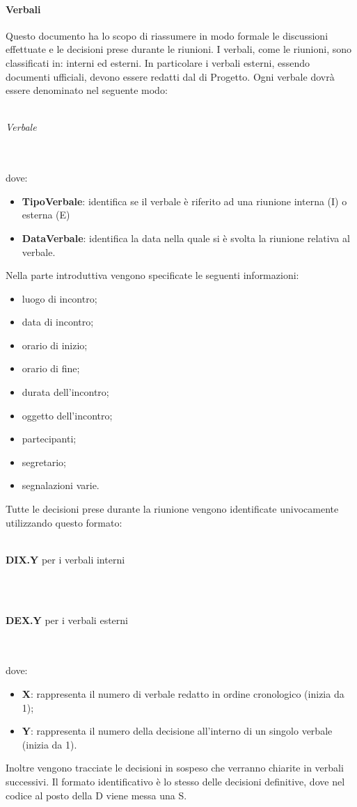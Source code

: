  \paragraph{Verbali}
Questo documento ha lo scopo di riassumere in modo formale le discussioni effettuate e le decisioni prese durante le riunioni. I verbali, come le riunioni, sono classificati in: interni ed esterni. In
particolare i verbali esterni, essendo documenti ufficiali, devono essere redatti dal \RESP{} di Progetto.
Ogni verbale dovrà essere denominato nel seguente modo:\\ \\
\centerline{\textit{Verbale}}
\\ \\
dove:
\begin{itemize}
	\item \textbf{TipoVerbale}: identifica se il verbale è riferito ad una riunione interna (I) o esterna (E)
	\item \textbf{DataVerbale}: identifica la data nella quale si è svolta la riunione relativa al verbale.
\end{itemize}
Nella parte introduttiva vengono specificate le seguenti informazioni:
\begin{itemize}
	\item luogo di incontro;
	\item data di incontro;
	\item orario di inizio;
	\item orario di fine;
	\item durata dell'incontro;
	\item oggetto dell'incontro;
	\item partecipanti;
	\item segretario;
	\item segnalazioni varie.
\end{itemize}
Tutte le decisioni prese durante la riunione vengono identificate univocamente utilizzando questo formato: \\ \\
\centerline{\textbf{DIX.Y} per i verbali interni}  \\ \\
\centerline{\textbf{DEX.Y} per i verbali esterni}  \\ \\
dove:
\begin{itemize}
	\item \textbf{X}: rappresenta il numero di verbale redatto in ordine cronologico (inizia da 1);
	\item \textbf{Y}: rappresenta il numero della decisione all'interno di un singolo verbale (inizia da 1).
\end{itemize}
Inoltre vengono tracciate le decisioni in sospeso che verranno chiarite in verbali successivi. Il formato identificativo è lo stesso delle decisioni definitive, dove nel codice al posto della D viene messa una S.
